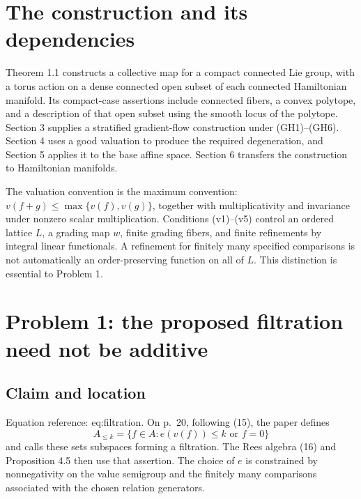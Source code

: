 \documentclass[10pt]{article}
\begin{document}
\section*{The construction and its dependencies}
Theorem 1.1 constructs a collective map for a compact connected Lie group, with a torus action on a dense connected open subset of each connected Hamiltonian manifold. Its compact-case assertions include connected fibers, a convex polytope, and a description of that open subset using the smooth locus of the polytope. Section 3 supplies a stratified gradient-flow construction under (GH1)–(GH6). Section 4 uses a good valuation to produce the required degeneration, and Section 5 applies it to the base affine space. Section 6 transfers the construction to Hamiltonian manifolds.\par
The valuation convention is the maximum convention: \(v(f+g)\leq\max\{v(f),v(g)\}\), together with multiplicativity and invariance under nonzero scalar multiplication. Conditions (v1)–(v5) control an ordered lattice \(L\), a grading map \(w\), finite grading fibers, and finite refinements by integral linear functionals. A refinement for finitely many specified comparisons is not automatically an order-preserving function on all of \(L\). This distinction is essential to Problem 1.\par
\section*{Problem 1: the proposed filtration need not be additive}
\subsection*{Claim and location}
Equation reference: eq:filtration. On p. 20, following (15), the paper defines \[
 A_{\leq k}=\{f\in A:e(v(f))\leq k\text{ or }f=0\}\] and calls these sets subspaces forming a filtration. The Rees algebra (16) and Proposition 4.5 then use that assertion. The choice of \(e\) is constrained by nonnegativity on the value semigroup and the finitely many comparisons associated with the chosen relation generators.\par
\end{document}

